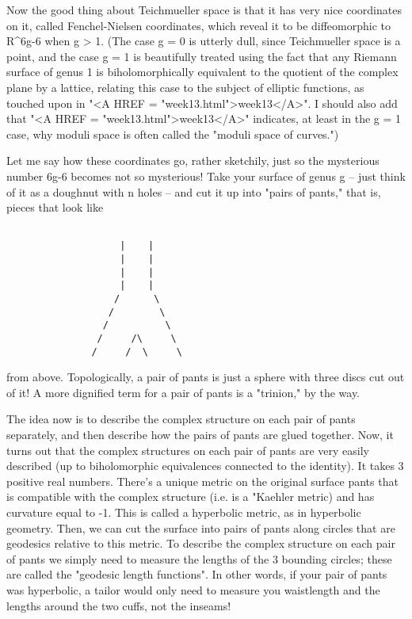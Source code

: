 Now the good thing about Teichmueller space is that it has very nice
coordinates on it, called Fenchel-Nielsen coordinates, which reveal it
to be diffeomorphic to R^{6g-6} when g > 1.   (The case g = 0 is utterly
dull, since Teichmueller space is a point, and the case g = 1 is
beautifully treated using the fact that any Riemann surface of genus 1
is biholomorphically equivalent to the quotient of the complex plane by
a lattice, relating this case to the subject of elliptic functions, as
touched upon in "<A HREF = "week13.html">week13</A>".  I should also add that "<A HREF = "week13.html">week13</A>" indicates, at
least in the g = 1 case, why moduli space is often called the "moduli
space of curves.")  

Let me say how these coordinates go, rather sketchily, just so the
mysterious number 6g-6 becomes not so mysterious!  Take your surface of
genus g -- just think of it as a doughnut with n holes -- and cut it up
into "pairs of pants," that is, pieces that look like


\begin{verbatim}

                    |    |
                    |    |
                    |    |
                    |    |
                   /      \
                  /        \
                 /          \
                /     /\     \
               /     /  \     \

\end{verbatim}
    

from above.  Topologically, a pair of pants is just a sphere with three
discs cut out of it!  A more dignified term for a pair of pants is a
"trinion," by the way.  

The idea now is to describe the complex structure on each pair of pants
separately, and then describe how the pairs of pants are glued together. 
Now, it turns out that the complex structures on each pair of pants are
very easily described (up to biholomorphic equivalences connected to the
identity). It takes 3 positive real numbers.  There's a unique metric on the
original surface pants that is compatible with the complex structure
(i.e. is a "Kaehler metric) and has curvature equal to -1.  This is
called a hyperbolic metric, as in hyperbolic geometry.  Then, we can cut
the surface into pairs of pants along circles that are geodesics
relative to this metric.   To describe the complex structure on each
pair of pants we simply need to measure the lengths of the 3 bounding
circles; these are called the "geodesic length functions".   In other
words, if your pair of pants was hyperbolic, a tailor would only need to
measure you waistlength and the lengths around the two cuffs, not the inseams!

